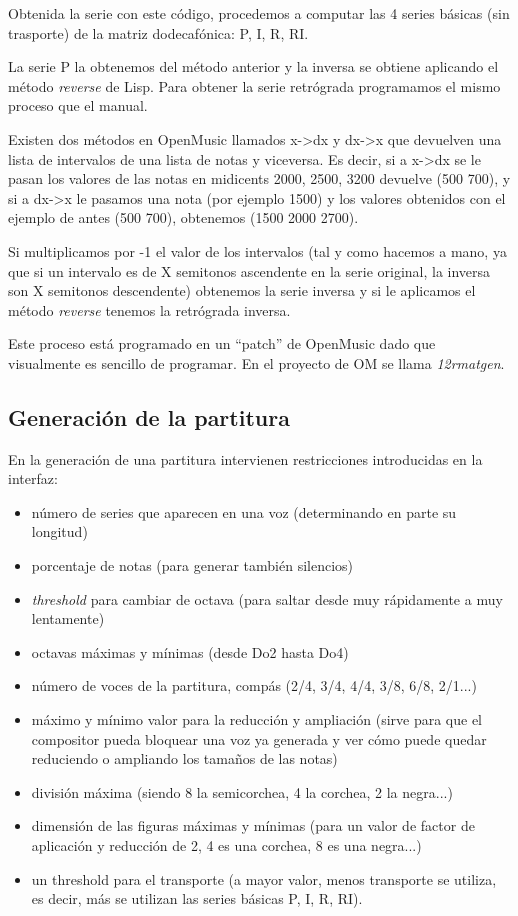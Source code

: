 \documentclass[a4paper,openany,oneside,12pt]{book}
\begin{document}
Obtenida la serie con este código, procedemos a computar las 4 series básicas (sin trasporte) de la matriz dodecafónica: P, I, R, RI.

La serie P la obtenemos del método anterior y la inversa se obtiene aplicando el método \emph{reverse} de Lisp. Para obtener la serie retrógrada programamos el mismo proceso que el manual.

Existen dos métodos en OpenMusic llamados x->dx y dx->x que devuelven una lista de intervalos de una lista de notas y viceversa. Es decir, si a x->dx se le pasan los valores de las notas en midicents 2000, 2500, 3200 devuelve (500 700), y si a dx->x le pasamos una nota (por ejemplo 1500) y los valores obtenidos con el ejemplo de antes (500 700), obtenemos (1500 2000 2700).

Si multiplicamos por -1 el valor de los intervalos (tal y como hacemos a mano, ya que si un intervalo es de X semitonos ascendente en la serie original, la inversa son X semitonos descendente) obtenemos la serie inversa y si le aplicamos el método \emph{reverse} tenemos la retrógrada inversa.

Este proceso está programado en un ``patch'' de OpenMusic dado que visualmente es sencillo de programar. En el proyecto de OM se llama \emph{12rmatgen}.

\subsection{Generación de la partitura}
En la generación de una partitura intervienen restricciones introducidas en la interfaz: 
\begin{itemize}
\item número de series que aparecen en una voz (determinando en parte su longitud)
\item porcentaje de notas (para generar también silencios)
\item \emph{threshold} para cambiar de octava (para saltar desde muy rápidamente a muy lentamente)
\item octavas máximas y mínimas (desde Do2 hasta Do4)
\item número de voces de la partitura, compás (2/4, 3/4, 4/4, 3/8, 6/8, 2/1...)
\item máximo y mínimo valor para la reducción y ampliación (sirve para que el compositor pueda bloquear una voz ya generada y ver cómo puede quedar reduciendo o ampliando los tamaños de las notas)
\item división máxima (siendo 8 la semicorchea, 4 la corchea, 2 la negra...)
\item dimensión de las figuras máximas y mínimas (para un valor de factor de aplicación y reducción de 2, 4 es una corchea, 8 es una negra...)
\item un threshold para el transporte (a mayor valor, menos transporte se utiliza, es decir, más se utilizan las series básicas P, I, R, RI).
\end{itemize}
\end{document}
